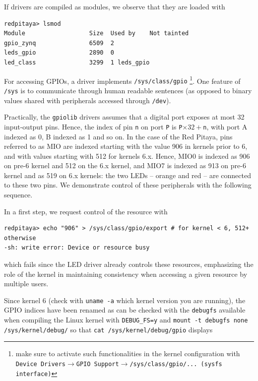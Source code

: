 \documentclass{article}
\begin{document}
{If drivers are compiled as modules, we observe that they are loaded with
{\footnotesize
\begin{verbatim}
redpitaya> lsmod
Module                  Size  Used by    Not tainted
gpio_zynq               6509  2 
leds_gpio               2890  0 
led_class               3299  1 leds_gpio
\end{verbatim}
}

For accessing GPIOs, a driver implements {\tt /sys/class/gpio}
\footnote{make sure to activate such functionalities in the kernel configuration with
{\tt Device Drivers}$\rightarrow${\tt GPIO Support}$\rightarrow${\tt /sys/class/gpio/... 
(sysfs interface)}}. One feature of {\tt /sys} is to communicate through human readable 
sentences (as opposed to binary values shared with peripherals accessed through {\tt /dev}).

\begin{framed}

Practically, the {\tt gpiolib} drivers assumes that a digital port exposes at most
32 input-output pins. Hence, the index of pin {\tt n} on port {\tt P} is 
{\tt P}$\times 32+${\tt n}, with port A indexed as 0, B indexed as 1 and so on. In the case
of the Red Pitaya, pins referred to as MIO are indexed starting with the value 906 in kernels
prior to 6, and with values starting with 512 for kernels 6.x. Hence,
MIO0 is indexed as 906 on pre-6 kernel and 512 on the 6.x kernel, and MIO7 is indexed as 913 on
pre-6 kernel and as 519 on 6.x kernels: the two LEDs -- orange and red -- are connected
to these two pins. We demonstrate control of these peripherals with the following sequence.

In a first step, we request control of the resource with 
{\footnotesize
\begin{verbatim}
redpitaya> echo "906" > /sys/class/gpio/export # for kernel < 6, 512+ otherwise
-sh: write error: Device or resource busy
\end{verbatim}
}
which fails since the LED driver already controls these resources, emphasizing the role of the 
kernel in maintaining consistency when accessing a given resource by multiple users.
\end{framed}


Since kernel 6 (check with {\tt uname -a} which kernel version you are running), the GPIO indices
have been renamed as can be checked with the {\tt debugfs} available when compiling the Linux
kernel with {\tt DEBUG\_FS=y} and {\tt mount -t debugfs none /sys/kernel/debug/} so that
{\tt cat /sys/kernel/debug/gpio} displays

}
\end{document}
